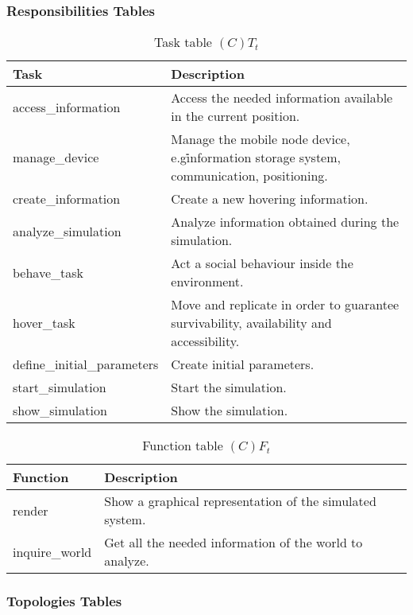 \subsubsection{Responsibilities Tables}

\begin{table}[H]
	\centering
	\begin{tabular}{|p{5cm}|p{7cm}|}
			\hline
			\textbf{Task} & \textbf{Description} \\
			\hline
			access\_information & Access the needed information available in the
			current position.\\
			\hline
			manage\_device & Manage the mobile node device, e.g\. information storage
			system, communication, positioning. \\
			\hline
			create\_information & Create a new hovering information. \\
			\hline
			analyze\_simulation & Analyze information obtained during the
			simulation.\\
			\hline
			behave\_task & Act a social behaviour inside the environment. \\
			\hline
			hover\_task & Move and replicate in order to guarantee survivability, availability
			and accessibility. \\
			\hline
			define\_initial\_parameters & Create initial parameters. \\
			\hline
			start\_simulation & Start the simulation. \\
			\hline
			show\_simulation & Show the simulation. \\
			\hline
		\end{tabular}
	\caption{Task table $(C)T_t$}
	\label{tab:ctt}
\end{table}

\begin{table}[H]
	\centering
	\begin{tabular}{|p{5cm}|p{7cm}|}
			\hline
			\textbf{Function} & \textbf{Description} \\
			\hline
			render & Show a graphical representation of the simulated system. \\
			\hline
			inquire\_world & Get all the needed information of the world to analyze.
			\\
		\end{tabular}
	\caption{Function table $(C)F_t$}
	\label{tab:cft}
\end{table}

\subsubsection{Topologies Tables}

